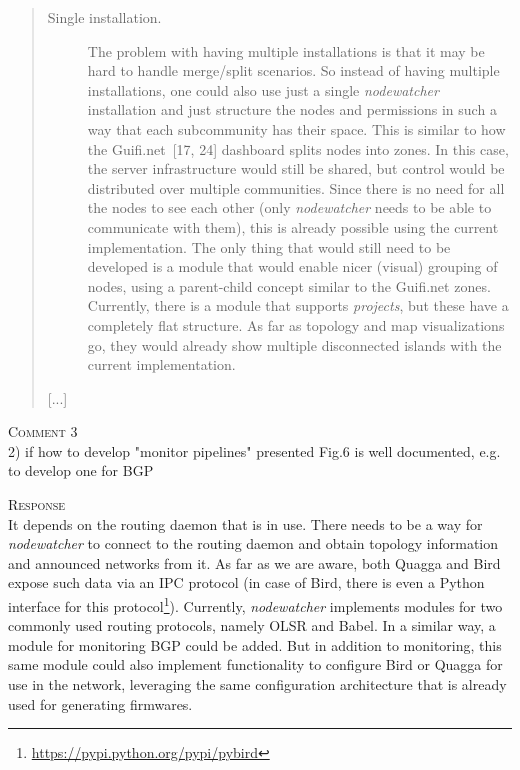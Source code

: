 \documentclass[12pt,twoside,a4paper]{report}
\newcommand{\nodewatcher}{\textit{nodewatcher}}
\begin{document}
\begin{quote}
\begin{description}
    \item[Single installation.] The problem with having multiple installations is that it may be hard to handle merge/split scenarios.
    So instead of having multiple installations, one could also use just a single \nodewatcher{} installation and just structure the nodes and permissions in such a way that each subcommunity has their space.
    This is similar to how the Guifi.net~[17, 24] dashboard splits nodes into zones.
    In this case, the server infrastructure would still be shared, but control would be distributed over multiple communities.
    Since there is no need for all the nodes to see each other (only \nodewatcher{} needs to be able to communicate with them), this is already possible using the current implementation.
    The only thing that would still need to be developed is a module that would enable nicer (visual) grouping of nodes, using a parent-child concept similar to the Guifi.net zones.
    Currently, there is a module that supports \textit{projects}, but these have a completely flat structure.
    As far as topology and map visualizations go, they would already show multiple disconnected islands with the current implementation.
\end{description}

[...]

\end{quote}

\vspace{0.5cm}\noindent\textsc{Comment 3}\\
  2) if how to develop "monitor pipelines" presented Fig.6 is well documented, e.g. to develop one for BGP
  
\vspace{0.5cm}\noindent\textsc{Response}\\
It depends on the routing daemon that is in use.
There needs to be a way for \nodewatcher{} to connect to the routing daemon and obtain topology information and announced networks from it.
As far as we are aware, both Quagga and Bird expose such data via an IPC protocol (in case of Bird, there is even a Python interface for this protocol\footnote{\url{https://pypi.python.org/pypi/pybird}}).
Currently, \nodewatcher{} implements modules for two commonly used routing protocols, namely OLSR and Babel.
In a similar way, a module for monitoring BGP could be added.
But in addition to monitoring, this same module could also implement functionality to configure Bird or Quagga for use in the network, leveraging the same configuration architecture that is already used for generating firmwares.
\end{document}

